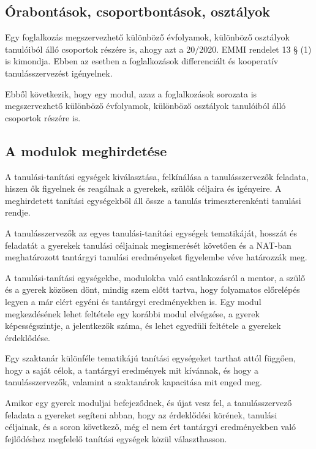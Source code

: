 \hypertarget{orabontasok-csoportbontasok-osztalyok}{%
\subsection{Órabontások, csoportbontások,
osztályok}\label{orabontasok-csoportbontasok-osztalyok}}

Egy foglalkozás megszervezhető különböző évfolyamok, különböző osztályok
tanulóiból álló csoportok részére is, ahogy azt a 20/2020. EMMI rendelet
13 § (1) is kimondja. Ebben az esetben a foglalkozások differenciált és
kooperatív tanulásszervezést igényelnek.

Ebből következik, hogy egy modul, azaz a foglalkozások sorozata is
megszervezhető különböző évfolyamok, különböző osztályok tanulóiból álló
csoportok részére is.

\hypertarget{a-modulok-meghirdetese}{%
\subsection{A modulok meghirdetése}\label{a-modulok-meghirdetese}}

A tanulási-tanítási egységek kiválasztása, felkínálása a
tanulásszervezők feladata, hiszen ők figyelnek és reagálnak a gyerekek,
szülők céljaira és igényeire. A meghirdetett tanítási egységekből áll
össze a tanulás trimeszterenkénti tanulási rendje.

A tanulásszervezők az egyes tanulási-tanítási egységek tematikáját,\break
hosszát és feladatát a gyerekek tanulási céljainak megismerését követően
és a NAT-ban meghatározott tantárgyi tanulási eredményeket figyelembe véve
határozzák meg.

A tanulási-tanítási egységekbe, modulokba való csatlakozásról a mentor,
a szülő és a gyerek közösen dönt, mindig szem előtt tartva, hogy
folyamatos előrelépés legyen a már elért egyéni és tantárgyi
eredményekben is. Egy modul megkezdésének lehet feltétele egy korábbi
modul elvégzése, a gyerek képességszintje, a jelentkezők száma, és lehet
egyedüli feltétele a gyerekek érdeklődése.

Egy szaktanár különféle tematikájú tanítási egységeket tarthat attól
függően, hogy a saját célok, a tantárgyi eredmények mit kívánnak, és
hogy a
tanulásszervezők, valamint a szaktanárok kapacitása mit enged meg.

Amikor egy gyerek moduljai befejeződnek, és újat vesz fel, a
tanulásszervező feladata a gyereket segíteni abban, hogy az érdeklődési
körének, tanulási céljainak, és a soron következő, még el nem ért
tantárgyi eredményekben való fejlődéshez megfelelő tanítási egységek
közül választhasson.

